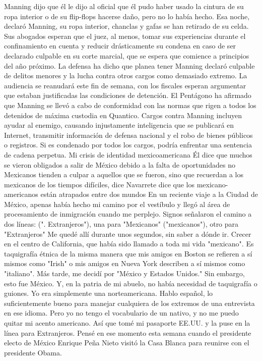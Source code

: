 Manning dijo que él le dijo al oficial que él pudo haber usado la cintura de su ropa interior o de su flip-flops hacerse daño, pero no lo había hecho.
Esa noche, declaró Manning, su ropa interior, chanclas y gafas se han retirado de su celda.
Sus abogados esperan que el juez, al menos, tomar sus experiencias durante el confinamiento en cuenta y reducir drásticamente su condena en caso de ser declarado culpable en su corte marcial, que se espera que comience a principios del año próximo.
La defensa ha dicho que planea tener Manning declaró culpable de delitos menores y la lucha contra otros cargos como demasiado extremo.
La audiencia se reanudará este fin de semana, con los fiscales esperan argumentar que estaban justificadas las condiciones de detención.
El Pentágono ha afirmado que Manning se llevó a cabo de conformidad con las normas que rigen a todos los detenidos de máxima custodia en Quantico.
Cargos contra Manning incluyen ayudar al enemigo, causando injustamente inteligencia que se publicará en Internet, transmitir información de defensa nacional y el robo de bienes públicos o registros.
Si es condenado por todos los cargos, podría enfrentar una sentencia de cadena perpetua.
Mi crisis de identidad mexicoamericana
Él dice que muchos se vieron obligados a salir de México debido a la falta de oportunidades no
Mexicanos tienden a culpar a aquellos que se fueron, sino que recuerdan a los mexicanos de los tiempos difíciles, dice
Navarrete dice que los mexicano-americanos están atrapados entre dos mundos
En un reciente viaje a la Ciudad de México, apenas había hecho mi camino por el vestíbulo y llegó al área de procesamiento de inmigración cuando me perplejo.
Signos señalaron el camino a dos líneas: (". Extranjeros"), una para "Mexicanos" ("mexicanos"), otro para "Extranjeros"
Me quedé allí durante unos segundos, sin saber a dónde ir.
Crecer en el centro de California, que había sido llamado a toda mi vida "mexicano".
Es taquigrafía étnica de la misma manera que mis amigos en Boston se refieren a sí mismos como "Irish" o mis amigos en Nueva York describen a sí mismos como "italiano".
Más tarde, me decidí por "México y Estados Unidos."
Sin embargo, esto fue México.
Y, en la patria de mi abuelo, no había necesidad de taquigrafía o guiones.
Yo era simplemente una norteamericana.
Hablo español, lo suficientemente bueno para manejar cualquiera de los extremos de una entrevista en ese idioma.
Pero yo no tengo el vocabulario de un nativo, y no me puedo quitar mi acento americano.
Así que tomé mi pasaporte EE.UU. y la puse en la línea para Extranjeros.
Pensé en ese momento esta semana cuando el presidente electo de México Enrique Peña Nieto visitó la Casa Blanca para reunirse con el presidente Obama.

